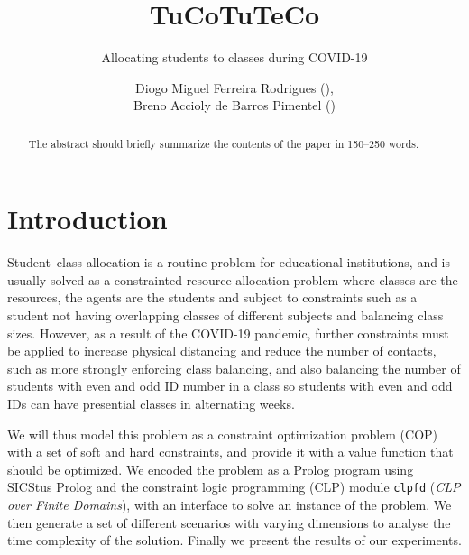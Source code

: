 \documentclass[runningheads]{llncs}
\begin{document}
\title{TuCoTuTeCo}
\subtitle{Allocating students to classes during COVID-19}
%
%
\author{Diogo Miguel Ferreira Rodrigues (),\\
Breno Accioly de Barros Pimentel ()}


%
\maketitle              %
%
\begin{abstract}
The abstract should briefly summarize the contents of the paper in
150--250 words.

\end{abstract}

\section{Introduction}

Student--class allocation is a routine problem for educational institutions, and is usually solved as a constrainted resource allocation problem where classes are the resources, the agents are the students and subject to constraints such as a student not having overlapping classes of different subjects and balancing class sizes. However, as a result of the COVID-19 pandemic, further constraints must be applied to increase physical distancing and reduce the number of contacts, such as more strongly enforcing class balancing, and also balancing the number of students with even and odd ID number in a class so students with even and odd IDs can have presential classes in alternating weeks.

We will thus model this problem as a constraint optimization problem (COP) with a set of soft and hard constraints, and provide it with a value function that should be optimized. We encoded the problem as a Prolog program using SICStus Prolog and the constraint logic programming (CLP) module \texttt{clpfd} (\textit{CLP over Finite Domains}), with an interface to solve an instance of the problem. We then generate a set of different scenarios with varying dimensions to analyse the time complexity of the solution. Finally we present the results of our experiments.
\end{document}
